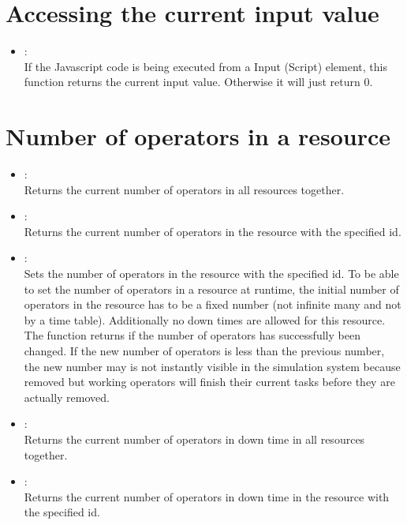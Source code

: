 \section{Accessing the current input value}

\begin{itemize}

\item
{}:\\
If the Javascript code is being executed from a Input (Script) element,
this function returns the current input value. Otherwise it will just return  0. 

\end{itemize}

\section{Number of operators in a resource}

\begin{itemize}
	
\item
{}:\\
Returns the current number of operators in all resources together.
  
\item
{}:\\
Returns the current number of operators in the resource with the specified id.  
  
\item
{}:\\
Sets the number of operators in the resource with the specified id.
To be able to set the number of operators in a resource at runtime,
the initial number of operators in the resource has to be a fixed number
(not infinite many and not by a time table). Additionally no down times
are allowed for this resource.
The function returns  if the number of operators has successfully 
been changed. If the new number of operators is less than the previous number,
the new number may is not instantly visible in the simulation system because
removed but working operators will finish their current tasks before they are
actually removed.

\item
{}:\\
Returns the current number of operators in down time in all resources together.

\item
{}:\\
Returns the current number of operators in down time in the resource with the specified id.  
	
\end{itemize}

